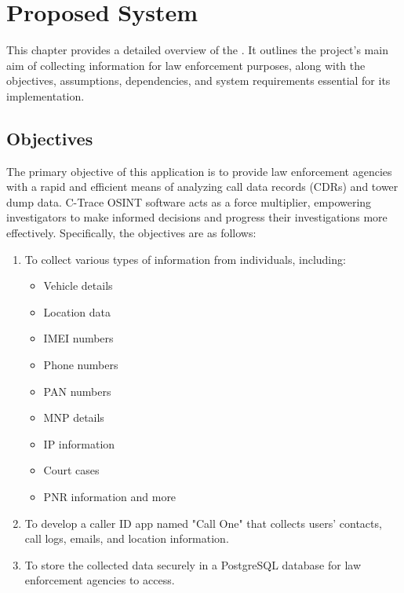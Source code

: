 
\chapter{Proposed System}
\justify

This chapter provides a detailed overview of the \textbf{{\myprojectname}}. It outlines the project's main aim of collecting information for law enforcement purposes, along with the objectives, assumptions, dependencies, and system requirements essential for its implementation.

\section{Objectives}

The primary objective of this application is to provide law enforcement agencies with a rapid and efficient means of analyzing call data records (CDRs) and tower dump data. C-Trace OSINT software acts as a force multiplier, empowering investigators to make informed decisions and progress their investigations more effectively. Specifically, the objectives are as follows:

\begin{enumerate}[label=\roman*.]
    \item To collect various types of information from individuals, including:
    \begin{itemize}
        \item Vehicle details
        \item Location data
        \item IMEI numbers
        \item Phone numbers
        \item PAN numbers
        \item MNP details
        \item IP information
        \item Court cases
        \item PNR information and more
    \end{itemize}
    \item To develop a caller ID app named "Call One" that collects users' contacts, call logs, emails, and location information.
    \item To store the collected data securely in a PostgreSQL database for law enforcement agencies to access.

\end{enumerate}


